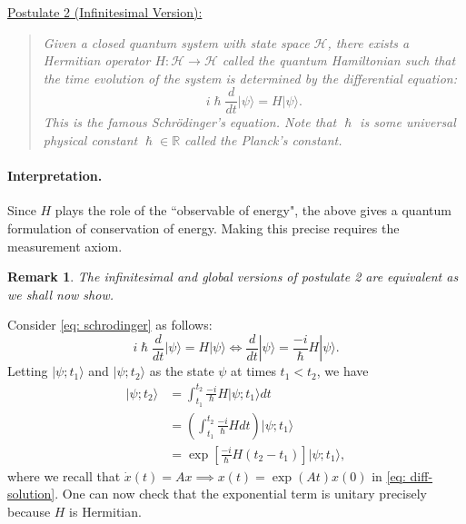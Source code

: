 \documentclass{article}
\newtheorem*{remark}{Remark}
\newcommand{\ket}[1]{|#1\rangle}
\newcommand{\calH}{\mathcal{H}}
\begin{document}
\begin{framed}
\underline{Postulate 2 (Infinitesimal Version):}
\begin{quote}
\textit{Given a closed quantum system with state space $\calH$, there exists a Hermitian operator $H: \calH \to \calH$ called the {\em quantum Hamiltonian} such that the time evolution of the system is determined by the differential equation:
\begin{equation}
    \label{eq: schrodinger}
    i \hslash \frac{d}{dt} \ket{\psi} = H\ket{\psi}.
\end{equation}
This is the famous {\em Schr\"odinger's equation}. Note that $\hslash$ is some universal physical constant $\hslash \in \mathbb{R}$ called the {\em Planck's constant}.
}
\end{quote}
\end{framed}
\paragraph{Interpretation.} Since $H$ plays the role of the ``observable of energy", the above gives a quantum formulation of conservation of energy.  Making this precise requires the measurement axiom.
\begin{remark}
    The infinitesimal and global versions of postulate 2 are equivalent as we shall now show.
\end{remark}
\noindent Consider \eqref{eq: schrodinger} as follows:
\[
i \hslash \frac{d}{dt} \ket{\psi} = H\ket{\psi} \iff  \frac{d}{dt} \ket{\psi} = \frac{-i}{\hslash}H\ket{\psi}.
\]
Letting $\ket{\psi; t_1}$ and $\ket{\psi; t_2}$ as the state $\psi$ at times $t_1 < t_2$, we have
\begin{align}
    \ket{\psi; t_2} 
    &= \int_{t_1}^{t_2} \frac{-i}{\hslash}H\ket{\psi; t_1} dt \nonumber\\
    &= \left(\int_{t_1}^{t_2} \frac{-i}{\hslash}H dt \right)\ket{\psi; t_1}\nonumber \\
    &= \exp\left[\frac{-i}{\hslash}H (t_2 - t_1) \right]\ket{\psi; t_1}\label{eq: diff-solution},
\end{align}
where we recall that $\dot{x}(t) = Ax \implies x(t) = \exp(At)x(0)$ in \eqref{eq: diff-solution}. One can now check that the exponential term is unitary precisely because $H$ is Hermitian.
\end{document}
